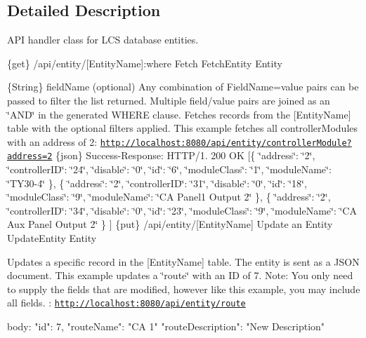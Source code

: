 \subsection{Detailed Description}
A\+PI handler class for L\+CS database entities. 

\{get\} /api/entity/\mbox{[}Entity\+Name\mbox{]}\+:where Fetch  Fetch\+Entity  Entity

\{String\} field\+Name (optional) Any combination of Field\+Name=value pairs can be passed to filter the list returned. Multiple field/value pairs are joined as an \char`\"{}\+A\+N\+D\char`\"{} in the generated W\+H\+E\+RE clause.  Fetches records from the \mbox{[}Entity\+Name\mbox{]} table with the optional filters applied.  This example fetches all controller\+Modules with an address of 2\+: \href{http://localhost:8080/api/entity/controllerModule?address=2}{\tt http\+://localhost\+:8080/api/entity/controller\+Module?address=2}  \{json\} Success-\/\+Response\+: H\+T\+T\+P/1. 200 OK \mbox{[}\{ \char`\"{}address\char`\"{}\+: \char`\"{}2\char`\"{}, \char`\"{}controller\+I\+D\char`\"{}\+: \char`\"{}24\char`\"{}, \char`\"{}disable\char`\"{}\+: \char`\"{}0\char`\"{}, \char`\"{}id\char`\"{}\+: \char`\"{}6\char`\"{}, \char`\"{}module\+Class\char`\"{}\+: \char`\"{}1\char`\"{}, \char`\"{}module\+Name\char`\"{}\+: \char`\"{}\+T\+Y30-\/4\char`\"{} \}, \{ \char`\"{}address\char`\"{}\+: \char`\"{}2\char`\"{}, \char`\"{}controller\+I\+D\char`\"{}\+: \char`\"{}31\char`\"{}, \char`\"{}disable\char`\"{}\+: \char`\"{}0\char`\"{}, \char`\"{}id\char`\"{}\+: \char`\"{}18\char`\"{}, \char`\"{}module\+Class\char`\"{}\+: \char`\"{}9\char`\"{}, \char`\"{}module\+Name\char`\"{}\+: \char`\"{}\+C\+A Panel1 Output 2\char`\"{} \}, \{ \char`\"{}address\char`\"{}\+: \char`\"{}2\char`\"{}, \char`\"{}controller\+I\+D\char`\"{}\+: \char`\"{}34\char`\"{}, \char`\"{}disable\char`\"{}\+: \char`\"{}0\char`\"{}, \char`\"{}id\char`\"{}\+: \char`\"{}23\char`\"{}, \char`\"{}module\+Class\char`\"{}\+: \char`\"{}9\char`\"{}, \char`\"{}module\+Name\char`\"{}\+: \char`\"{}\+C\+A Aux Panel Output 2\char`\"{} \} \mbox{]}  \{put\} /api/entity/\mbox{[}Entity\+Name\mbox{]} Update an Entity  Update\+Entity  Entity

Updates a specific record in the \mbox{[}Entity\+Name\mbox{]} table. The entity is sent as a J\+S\+ON document.  This example updates a \char`\"{}route\char`\"{} with an ID of 7. Note\+: You only need to supply the fields that are modified, however like this example, you may include all fields. \+: \href{http://localhost:8080/api/entity/route}{\tt http\+://localhost\+:8080/api/entity/route} \begin{DoxyVerb}body:
{
  "id": 7,
  "routeName": "CA 1"
  "routeDescription": "New Description"
}\end{DoxyVerb}


